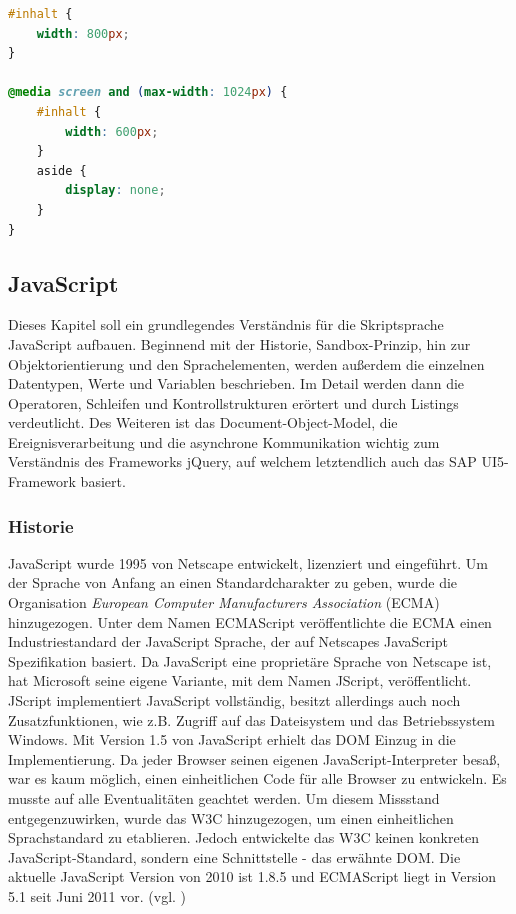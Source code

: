 \vspace{1em}
\begin{lstlisting}[language=CSS, caption=CSS3 eigenschaftsspezifisches Stylesheet, label=lst:css3mediaquery]
#inhalt {
	width: 800px;
}
 
@media screen and (max-width: 1024px) {
	#inhalt {
		width: 600px;
	}
	aside {
		display: none;
	}
}
\end{lstlisting}

\subsection{JavaScript}
Dieses Kapitel soll ein grundlegendes Verständnis für die Skriptsprache JavaScript aufbauen. Beginnend mit der Historie, Sandbox-Prinzip, hin zur Objektorientierung und den Sprachelementen, werden außerdem die einzelnen Datentypen, Werte und Variablen beschrieben. Im Detail werden dann die Operatoren, Schleifen und Kontrollstrukturen erörtert und durch Listings verdeutlicht. Des Weiteren ist das Document-Object-Model, die Ereignisverarbeitung und die asynchrone Kommunikation wichtig zum Verständnis des Frameworks jQuery, auf welchem letztendlich auch das SAP UI5-Framework basiert.

\subsubsection{Historie} JavaScript wurde 1995 von Netscape entwickelt, lizenziert und eingeführt. Um der Sprache von Anfang an einen Standardcharakter zu geben, wurde die Organisation \textit{European Computer Manufacturers Association} (ECMA) hinzugezogen. Unter dem Namen ECMAScript veröffentlichte die ECMA einen Industriestandard der JavaScript Sprache, der auf Netscapes JavaScript Spezifikation basiert. Da JavaScript eine proprietäre Sprache von Netscape ist, hat Microsoft seine eigene Variante, mit dem Namen JScript, veröffentlicht. JScript implementiert JavaScript vollständig, besitzt allerdings auch noch Zusatzfunktionen, wie z.B. Zugriff auf das Dateisystem und das Betriebssystem Windows. Mit Version 1.5 von JavaScript erhielt das DOM Einzug in die Implementierung. Da jeder Browser seinen eigenen JavaScript-Interpreter besaß, war es kaum möglich, einen einheitlichen Code für alle Browser zu entwickeln. Es musste auf alle Eventualitäten geachtet werden. Um diesem Missstand entgegenzuwirken, wurde das W3C hinzugezogen, um einen einheitlichen Sprachstandard zu etablieren. Jedoch entwickelte das W3C keinen konkreten JavaScript-Standard, sondern eine Schnittstelle - das erwähnte DOM. Die aktuelle JavaScript Version von 2010 ist 1.8.5 und ECMAScript liegt in Version 5.1 seit Juni 2011 vor. (vgl. \cite{SelfHtml20146})

